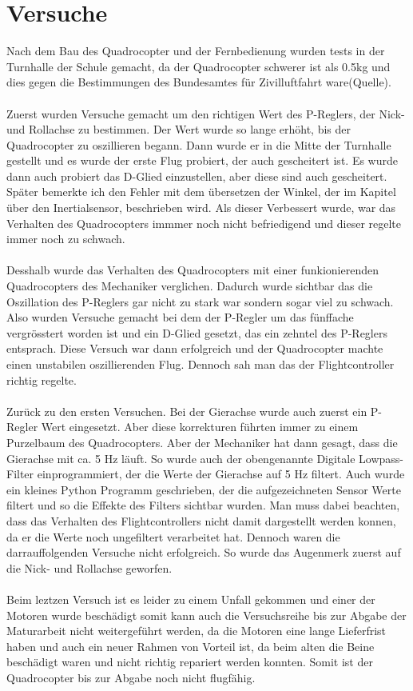 \documentclass[12pt,a4paper, ngerman]{article}
\begin{document}
\section{Versuche}
Nach dem Bau des Quadrocopter und der Fernbedienung wurden tests in der Turnhalle der Schule gemacht, da der Quadrocopter schwerer ist als 0.5kg und dies gegen die Bestimmungen des Bundesamtes für Zivilluftfahrt ware(Quelle). \\ \\Zuerst wurden Versuche gemacht um den richtigen Wert des P-Reglers, der Nick- und Rollachse zu bestimmen. Der Wert wurde so lange erhöht, bis der Quadrocopter zu oszillieren begann. Dann wurde er in die Mitte der Turnhalle gestellt und es wurde der erste Flug probiert, der auch gescheitert ist. Es wurde dann auch probiert das D-Glied einzustellen, aber diese sind auch gescheitert. Später bemerkte ich den Fehler mit dem übersetzen der Winkel, der im Kapitel über den Inertialsensor, beschrieben wird. Als dieser Verbessert wurde, war das Verhalten des Quadrocopters immmer noch nicht befriedigend und dieser regelte immer noch zu schwach. \\ \\ Desshalb wurde das Verhalten des Quadrocopters mit einer funkionierenden Quadrocopters des Mechaniker verglichen. Dadurch wurde sichtbar das die Oszillation des P-Reglers gar nicht zu stark war sondern sogar viel zu schwach. Also wurden Versuche gemacht bei dem der P-Regler um das fünffache vergrösstert worden ist und ein D-Glied gesetzt, das ein zehntel des P-Reglers entsprach. Diese Versuch war dann erfolgreich und der Quadrocopter machte einen unstabilen oszillierenden Flug. Dennoch sah man das der Flightcontroller richtig regelte. \\ \\
Zurück zu den ersten Versuchen. Bei der Gierachse wurde auch zuerst ein P-Regler Wert eingesetzt. Aber diese korrekturen führten immer zu einem Purzelbaum des Quadrocopters. Aber der Mechaniker hat dann gesagt, dass die Gierachse mit ca. 5 Hz läuft. So wurde auch der obengenannte Digitale Lowpass-Filter einprogrammiert, der die Werte der Gierachse auf 5 Hz filtert. Auch wurde ein kleines Python Programm geschrieben, der die aufgezeichneten Sensor Werte filtert und so die Effekte des Filters sichtbar wurden. Man muss dabei beachten, dass das Verhalten des Flightcontrollers nicht damit dargestellt werden konnen, da er die Werte noch ungefiltert verarbeitet hat. Dennoch waren die darrauffolgenden Versuche nicht erfolgreich. So wurde das Augenmerk zuerst auf die Nick- und Rollachse geworfen. \\ \\
Beim leztzen Versuch ist es leider zu einem Unfall gekommen und einer der Motoren wurde beschädigt somit kann auch die Versuchsreihe bis zur Abgabe der Maturarbeit nicht weitergeführt werden, da die Motoren eine lange Lieferfrist haben und auch ein neuer Rahmen von Vorteil ist, da beim alten die Beine beschädigt waren und nicht richtig repariert werden konnten. Somit ist der Quadrocopter bis zur Abgabe noch nicht flugfähig.
\newpage
\end{document}
